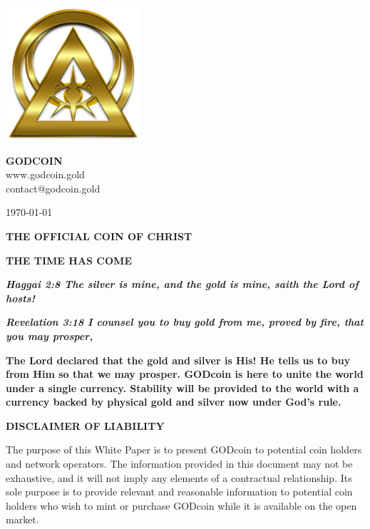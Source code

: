 \documentclass[12pt,a4paper]{article}
\begin{document}
  \begin{center}
    \includegraphics[width=50mm]{logo.png}\\
    \vspace{3mm}

    \Huge{\textbf{GODCOIN}}\\
    \vspace{3mm}
    \normalsize{www.godcoin.gold}\\
    \normalsize{contact@godcoin.gold}

    \normalsize{\today}

    \vspace{3mm}
    \LARGE{\textbf{THE OFFICIAL COIN OF CHRIST}}
    \vspace{3mm}

    \large{\textbf{THE TIME HAS COME}}
    \vspace{2mm}

    \normalsize{\color{Red}\textit{\textbf{Haggai 2:8 The silver is mine, and
    the gold is mine, saith the Lord of hosts!}}}

    \normalsize{\color{Red}\textit{\textbf{Revelation 3:18 I counsel you to buy
    gold from me, proved by fire, that you may prosper,}}}

    \vspace{5mm}

    \normalsize{\textbf{The Lord declared that the gold and silver is His! He
    tells us to buy from Him so that we may prosper. GODcoin is here to unite
    the world under a single currency. Stability will be provided to the world
    with a currency backed by physical gold and silver now under God's rule.}}

    \vspace{3mm}
  \end{center}

  \newpage
  \begin{center}
    \textbf{DISCLAIMER OF LIABILITY}
  \end{center}
  The purpose of this White Paper is to present GODcoin to potential coin
  holders and network operators. The information provided in this document may
  not be exhaustive, and it will not imply any elements of a contractual
  relationship. Its sole purpose is to provide relevant and reasonable
  information to potential coin holders who wish to mint or purchase GODcoin
  while it is available on the open market.\\
\end{document}
